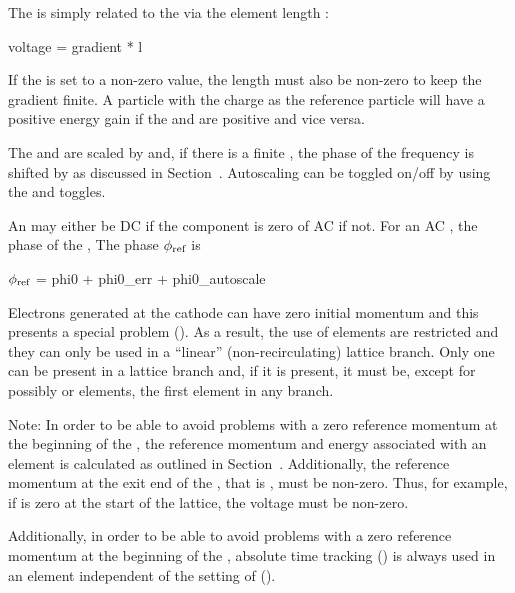 The  is simply related to the  via the element length :
\begin{example}
  voltage = gradient * l
\end{example}
If the  is set to a non-zero value, the length  must also be non-zero to
keep the gradient finite.  A particle with the charge as the reference particle will have
a positive energy gain if the  and  are positive and vice versa.

The  and  are scaled by  and, if there is a
finite , the phase of the frequency is shifted by  as
discussed in Section~. Autoscaling can be toggled on/off by using the
 and  toggles.

An  may either be DC if the  component is zero of AC if
not. For an AC , the phase of the , The phase $\phi_{\text{ref}}$
is 
\begin{example} 
  \(\phi_{\text{ref}}\) = phi0 + phi0_err + phi0_autoscale 
\end{example}

Electrons generated at the cathode can have zero initial momentum and
this presents a special problem (). As a result, the
use of  elements are restricted and they can only be used in
a ``linear'' (non-recirculating) lattice branch. Only one 
can be present in a lattice branch and, if it is present, it must be,
except for possibly  or  elements, the first
element in any branch.
 
Note: In order to be able to avoid problems with a zero reference
momentum at the beginning of the , the reference momentum
and energy associated with an  element is calculated as
outlined in Section~. Additionally, the reference
momentum at the exit end of the , that is , must be
non-zero. Thus, for example, if  is zero at the start of the
lattice, the  voltage must be non-zero. 

Additionally, in order to be able to avoid problems with a zero reference momentum at the
beginning of the , absolute time tracking () is always used in
an  element independent of the setting of 
().

